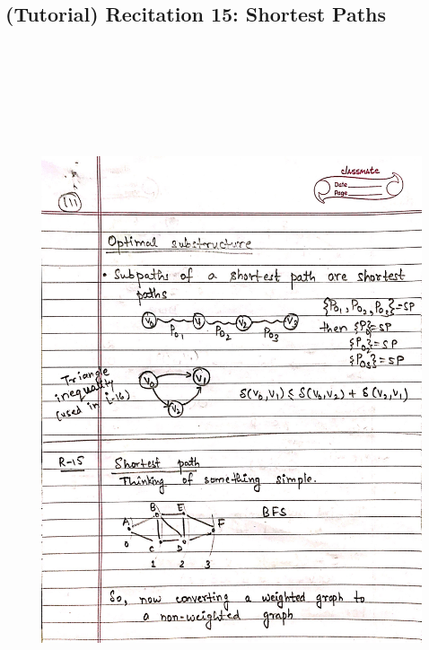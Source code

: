 \newpage
{\color{black} \subsection*{(Tutorial) Recitation 15: Shortest Paths}}
\begin{figure}[H]
    \centering
    \includegraphics[width=16cm, height=21cm]{"./MIT-6.006/MIT-6006-111"}
\end{figure}


